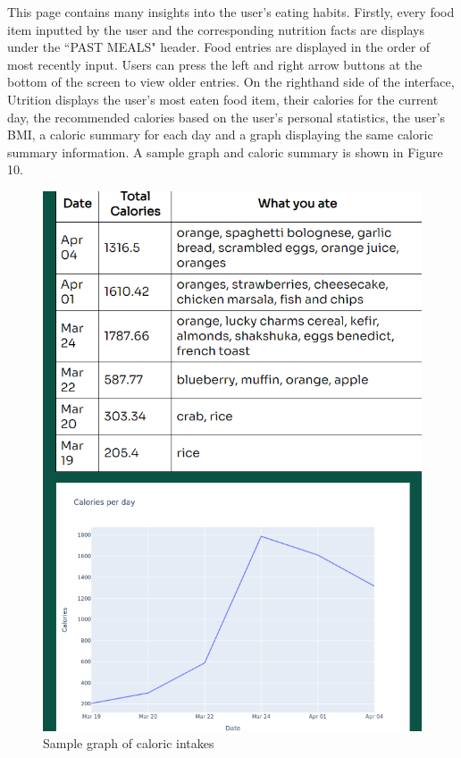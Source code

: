 \documentclass{article}
\begin{document}
This page contains many insights into the user's eating habits. Firstly, every food item inputted by the user and the corresponding nutrition facts are displays under the ``PAST MEALS" header. Food entries are displayed in the order of most recently input. Users can press the left and right arrow buttons at the bottom of the screen to view older entries. On the righthand side of the interface, Utrition displays the user's most eaten food item, their calories for the current day, the recommended calories based on the user's personal statistics, the user's BMI, a caloric summary for each day and a graph displaying the same caloric summary information. A sample graph and caloric summary is shown in Figure 10.

\begin{figure}[H]
	\centering
	\includegraphics[scale=0.70]{graph.png}
	\caption{Sample graph of caloric intakes}
\end{figure}
\end{document}

